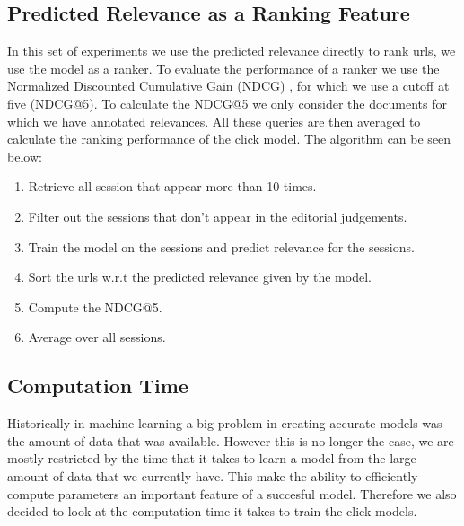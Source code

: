 \subsection{Predicted Relevance as a Ranking Feature}
In this set of experiments we use the predicted relevance directly to rank urls, we use the model as a ranker. To evaluate the performance of a ranker we use the Normalized Discounted Cumulative Gain (NDCG) \cite{NDCG}, for which we use a cutoff at five (NDCG@5). To calculate the NDCG@5 we only consider the documents for which we have annotated relevances. All these queries are then averaged to calculate the ranking performance of the click model. The algorithm can be seen below:

\begin{enumerate}
	\item Retrieve all session that appear more than 10 times.
	\item Filter out the sessions that don't appear in the editorial judgements.
	\item Train the model on the sessions and predict relevance for the sessions.
	\item Sort the urls w.r.t the predicted relevance given by the model.
	\item Compute the NDCG@5.
	\item Average over all sessions.
\end{enumerate}

\subsection{Computation Time}
Historically in machine learning a big problem in creating accurate models was the amount of data that was available. However this is no longer the case, we are mostly restricted by the time that it takes to learn a model from the large amount of data that we currently have. This make the ability to efficiently compute parameters an important feature of a succesful model. Therefore we also decided to look at the computation time it takes to train the click models.
